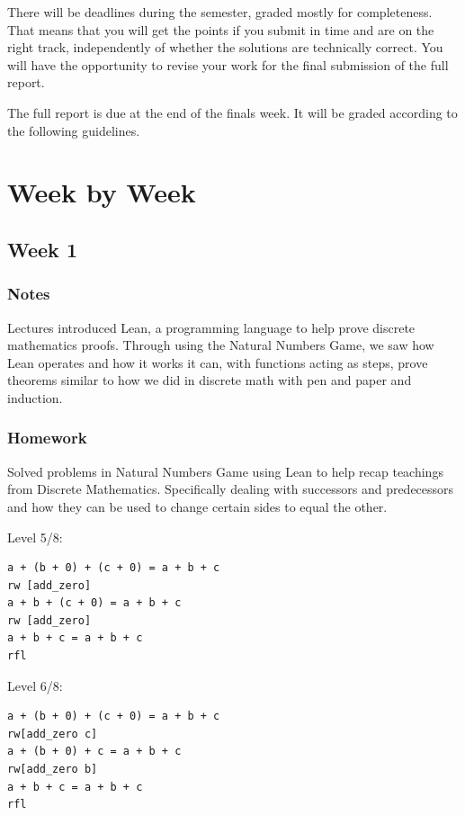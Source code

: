 \documentclass{article}
\theoremstyle{theorem}
\theoremstyle{definition}
\theoremstyle{remark}
\begin{document}
There will be deadlines during the semester, graded mostly for completeness. That means that you will get the points if you submit in time and are on the right track, independently of whether the solutions are technically correct. You will have the opportunity to revise your work for the final submission of the full report.

The full report is due at the end of the finals week. It will be graded according to the following guidelines.

\section{Week by Week}\label{homework}

\subsection{Week 1}

\subsubsection*{Notes}

Lectures introduced Lean, a programming language to help prove discrete mathematics proofs. Through using the Natural Numbers Game, we saw how Lean operates and how it works it can, with functions acting as steps, prove theorems similar to how we did in discrete math with pen and paper and induction.

\subsubsection*{Homework}

Solved problems in Natural Numbers Game using Lean to help recap teachings from Discrete Mathematics. Specifically dealing with successors and predecessors and how they can be used to change certain sides to equal the other.

Level 5/8:
\begin{lstlisting}
a + (b + 0) + (c + 0) = a + b + c
rw [add_zero]
a + b + (c + 0) = a + b + c
rw [add_zero]
a + b + c = a + b + c
rfl
\end{lstlisting}

Level 6/8:
\begin{lstlisting}
a + (b + 0) + (c + 0) = a + b + c
rw[add_zero c]
a + (b + 0) + c = a + b + c
rw[add_zero b]
a + b + c = a + b + c
rfl
\end{lstlisting}
\end{document}
